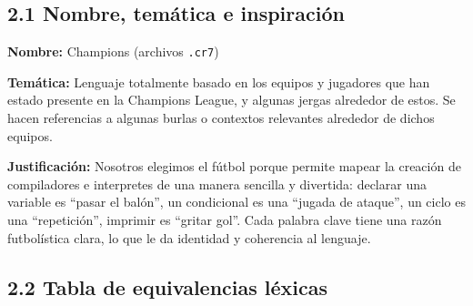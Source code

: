 \documentclass[12pt,a4paper]{article}
\begin{document}
\subsection*{2.1 Nombre, temática e inspiración}

\textbf{Nombre:} Champions (archivos \texttt{.cr7})

\textbf{Temática:} Lenguaje totalmente basado en los equipos y jugadores que han estado presente en la Champions League, y algunas jergas alrededor de estos. Se hacen referencias a algunas burlas o contextos relevantes alrededor de dichos equipos.

\textbf{Justificación:} Nosotros elegimos el fútbol porque permite mapear la creación de compiladores e interpretes de una manera sencilla y divertida: declarar una variable es ``pasar el balón'', un condicional es una ``jugada de ataque'', un ciclo es una ``repetición'', imprimir es ``gritar gol''. Cada palabra clave tiene una razón futbolística clara, lo que le da identidad y coherencia al lenguaje.

\subsection*{2.2 Tabla de equivalencias léxicas}
\end{document}
